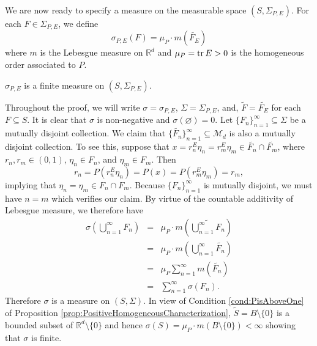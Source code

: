 \documentclass[smallextended]{svjour3}
\theoremstyle{remark}
\renewenvironment{proof}[1][\proofname]{\renewcommand\xproofname{#1}\xproof}{\endxproof}
\begin{document}
\noindent We are now ready to specify a measure on the measurable space $(S,\Sigma_{P,E})$. For each $F\in \Sigma_{P,E}$, we define
\begin{equation*}
\sigma_{P,E}(F)=\mu_P\cdot m(\widetilde{F_E})
\end{equation*}
where $m$ is the Lebesgue measure on $\mathbb{R}^d$ and $\mu_P=\tr E>0$ is the homogeneous order associated to $P$.

\begin{proposition}\label{prop:sigmaisameaure}
$\sigma_{P,E}$ is a finite measure on $(S,\Sigma_{P,E})$.
\end{proposition}
\begin{proof}

\noindent Throughout the proof, we will write $\sigma=\sigma_{P,E}$, $\Sigma=\Sigma_{P,E}$, and, $\widetilde{F}=\widetilde{F_E}$ for each $F\subseteq S$. It is clear that $\sigma$ is non-negative and $\sigma(\varnothing)=0$. Let $\{ F_n  \}^\infty_{n=1} \subseteq \Sigma $ be a mutually disjoint collection. We claim that $\{ \widetilde{F_n} \}_{n=1}^\infty\subseteq\mathcal{M}_d$ is also a mutually disjoint collection. To see this, suppose that $x = r_n^E \eta_n = r_m^E \eta_m\in \widetilde{F_n}\cap\widetilde{F_m}$, where $r_n,r_m \in (0,1)$, $\eta_n \in F_n$, and $\eta_m \in F_m $. Then
\begin{equation*}
    r_n = P(r_n^E \eta_n) = P(x) = P(r_m^E \eta_m) = r_m,
\end{equation*}
implying that $\eta_n = \eta_m\in F_n\cap F_m$. Because $\{F_n\}_{n=1}^\infty$ is mutually disjoint, we must have $n=m$ which verifies our claim. By virtue of the countable additivity of Lebesgue measure, we therefore have
\begin{eqnarray*}
\sigma\left(\bigcup_{n=1}^\infty F_n\right)
    &=& \mu_P\cdot m\left( \widetilde{\bigcup^\infty_{n=1} F_n } \right)\\
    &=& \mu_P\cdot m\left( \bigcup^\infty_{n=1}\widetilde{F_n} \right)\\
    &=& \mu_P\sum^\infty_{n=1} m(\widetilde{F_n})\\
    &=& \sum^\infty_{n=1}\sigma(F_n).
\end{eqnarray*}
Therefore $\sigma$ is a measure on $(S,\Sigma)$. In view of Condition \ref{cond:PisAboveOne} of Proposition \ref{prop:PositiveHomogeneousCharacterization}, $\widetilde{S}=B\setminus\{0\}$ is a bounded subset of $\mathbb{R}^d\setminus\{0\}$ and hence $\sigma(S)=\mu_P\cdot m(B\setminus\{0\})<\infty$ showing that $\sigma$ is finite.
\end{proof}
\end{document}
